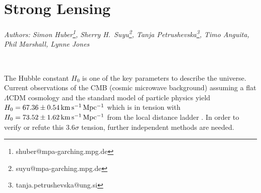 

\newcommand{\altsched}{\textcolor{magenta}{alt\_sched}} 
\newcommand{\altschedrolling}{\textcolor{blue}{alt\_sched\_rolling}}
\newcommand{\baseline}{\textcolor{orange}{baseline2018a}}
\newcommand{\colossusfour}{\textcolor{orange}{colossus\_2664}}
\newcommand{\colossusfive}{\textcolor{orange}{colossus\_2665}}
\newcommand{\colossusseven}{\textcolor{magenta}{colossus\_2667}}
\newcommand{\krakentwosix}{\textcolor{orange}{kraken\_2026}}
\newcommand{\krakenfive}{\textcolor{orange}{kraken\_2035}}
\newcommand{\krakenthreesix}{\textcolor{blue}{kraken\_2036}}
\newcommand{\krakentwo}{\textcolor{orange}{kraken\_2042}}
\newcommand{\krakenfour}{\textcolor{magenta}{Kraken\_2044}}
\newcommand{\mothrafive}{\textcolor{blue}{mothra\_2045}}
\newcommand{\mothranine}{\textcolor{blue}{Mothra\_2049}}
\newcommand{\nexusseven}{\textcolor{blue}{Nexus\_2097}}
\newcommand{\pontuszerozerotwo}{\textcolor{orange}{Pontus\_2002}}
\newcommand{\pontusfivezerotwo}{\textcolor{orange}{pontus\_2502}}
\newcommand{\pontusnine}{\textcolor{magenta}{pontus\_2489}}
\newcommand{\pontusfivezerosix}{\textcolor{magenta}{pontus\_2506}}
\newcommand{\rollingmixopsim}{\textcolor{magenta}{rolling\_mix\_10yrs\_opsim}}
\newcommand{\rollingopsim}{\textcolor{orange}{rolling\_10yrs\_opsim}}


\section{Strong Lensing}
\textit{Authors: Simon Huber\footnote{shuber@mpa-garching.mpg.de}, Sherry H.~Suyu\footnote{suyu@mpa-garching.mpg.de}, Tanja Petrushevska\footnote{tanja.petrushevska@ung.si}, Timo Anguita, Phil Marshall, Lynne Jones }

\

The Hubble constant $H_0$ is one of the key parameters to describe the
universe. Current observations of the CMB (cosmic microwave
background) assuming a flat $\Lambda$CDM cosmology and the standard
model of particle physics yield $H_0 = 67.36 \pm 0.54 \, {\rm km\,s^{-1}\,Mpc^{-1}}$
\citep{Planck:2018vks} which is in tension with $H_0 =
73.52 \pm
  1.62 \, {\rm km\,s^{-1}\,Mpc^{-1}}$ from the local distance ladder
\citep{Riess:2016jrr,Riess:2018byc}. In order to verify or refute this
$3.6 \sigma$ tension, further independent methods are needed. 

